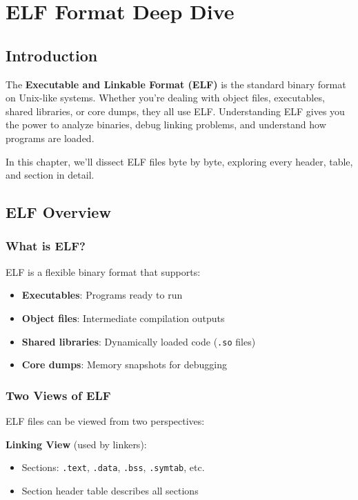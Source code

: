 \chapter{ELF Format Deep Dive}

\section{Introduction}

The \textbf{Executable and Linkable Format (ELF)} is the standard binary format on Unix-like systems. Whether you're dealing with object files, executables, shared libraries, or core dumps, they all use ELF. Understanding ELF gives you the power to analyze binaries, debug linking problems, and understand how programs are loaded.

In this chapter, we'll dissect ELF files byte by byte, exploring every header, table, and section in detail.

\section{ELF Overview}

\subsection{What is ELF?}

ELF is a flexible binary format that supports:
\begin{itemize}
    \item \textbf{Executables}: Programs ready to run
    \item \textbf{Object files}: Intermediate compilation outputs
    \item \textbf{Shared libraries}: Dynamically loaded code (\texttt{.so} files)
    \item \textbf{Core dumps}: Memory snapshots for debugging
\end{itemize}

\subsection{Two Views of ELF}

ELF files can be viewed from two perspectives:

\textbf{Linking View} (used by linkers):
\begin{itemize}
    \item Sections: \texttt{.text}, \texttt{.data}, \texttt{.bss}, \texttt{.symtab}, etc.
    \item Section header table describes all sections
\end{itemize}


